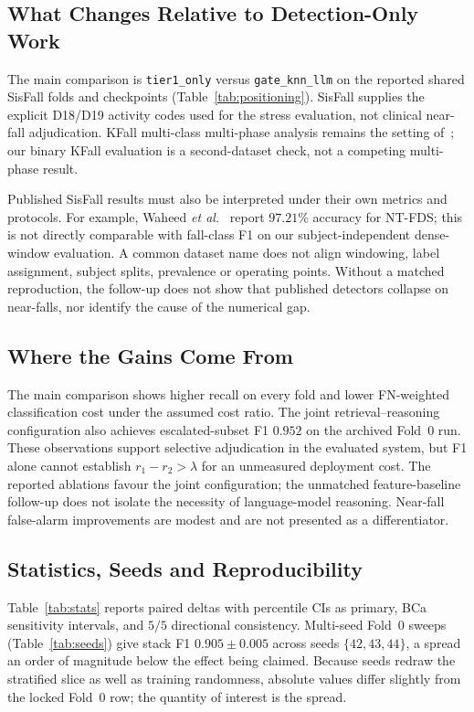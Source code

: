 \documentclass[journal]{IEEEtran}
\begin{document}
\subsection{What Changes Relative to Detection-Only Work}
The main comparison is \texttt{tier1\_only} versus \texttt{gate\_knn\_llm} on the reported shared SisFall folds and checkpoints (Table~\ref{tab:positioning}). SisFall supplies the explicit D18/D19 activity codes used for the stress evaluation, not clinical near-fall adjudication. KFall multi-class multi-phase analysis remains the setting of~\cite{bhatti2025beyond}; our binary KFall evaluation is a second-dataset check, not a competing multi-phase result.

Published SisFall results must also be interpreted under their own metrics and protocols. For example, Waheed \textit{et al.}~\cite{waheed2021ntfds} report $97.21\%$ accuracy for NT-FDS; this is not directly comparable with fall-class F1 on our subject-independent dense-window evaluation. A common dataset name does not align windowing, label assignment, subject splits, prevalence or operating points. Without a matched reproduction, the follow-up does not show that published detectors collapse on near-falls, nor identify the cause of the numerical gap.

\subsection{Where the Gains Come From}
The main comparison shows higher recall on every fold and lower FN-weighted classification cost under the assumed cost ratio. The joint retrieval--reasoning configuration also achieves escalated-subset F1 $0.952$ on the archived Fold~0 run. These observations support selective adjudication in the evaluated system, but F1 alone cannot establish $r_1-r_2>\lambda$ for an unmeasured deployment cost. The reported ablations favour the joint configuration; the unmatched feature-baseline follow-up does not isolate the necessity of language-model reasoning. Near-fall false-alarm improvements are modest and are not presented as a differentiator.

\subsection{Statistics, Seeds and Reproducibility}
Table~\ref{tab:stats} reports paired deltas with percentile CIs as primary, BCa sensitivity intervals, and $5/5$ directional consistency. Multi-seed Fold~0 sweeps (Table~\ref{tab:seeds}) give stack F1 $0.905{\pm}0.005$ across seeds $\{42,43,44\}$, a spread an order of magnitude below the effect being claimed. Because seeds redraw the stratified slice as well as training randomness, absolute values differ slightly from the locked Fold~0 row; the quantity of interest is the spread.
\end{document}
